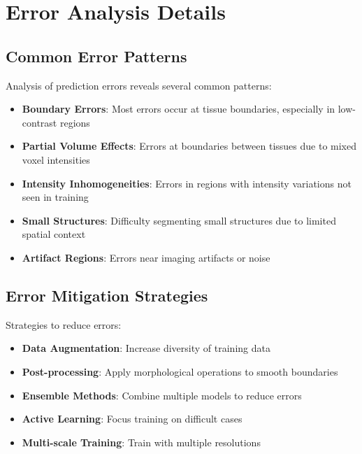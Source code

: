 \documentclass[12pt,a4paper]{article}
\begin{document}
\section{Error Analysis Details}

\subsection{Common Error Patterns}

Analysis of prediction errors reveals several common patterns:

\begin{itemize}
    \item \textbf{Boundary Errors}: Most errors occur at tissue boundaries, especially in low-contrast regions
    \item \textbf{Partial Volume Effects}: Errors at boundaries between tissues due to mixed voxel intensities
    \item \textbf{Intensity Inhomogeneities}: Errors in regions with intensity variations not seen in training
    \item \textbf{Small Structures}: Difficulty segmenting small structures due to limited spatial context
    \item \textbf{Artifact Regions}: Errors near imaging artifacts or noise
\end{itemize}

\subsection{Error Mitigation Strategies}

Strategies to reduce errors:

\begin{itemize}
    \item \textbf{Data Augmentation}: Increase diversity of training data
    \item \textbf{Post-processing}: Apply morphological operations to smooth boundaries
    \item \textbf{Ensemble Methods}: Combine multiple models to reduce errors
    \item \textbf{Active Learning}: Focus training on difficult cases
    \item \textbf{Multi-scale Training}: Train with multiple resolutions
\end{itemize}
\end{document}

